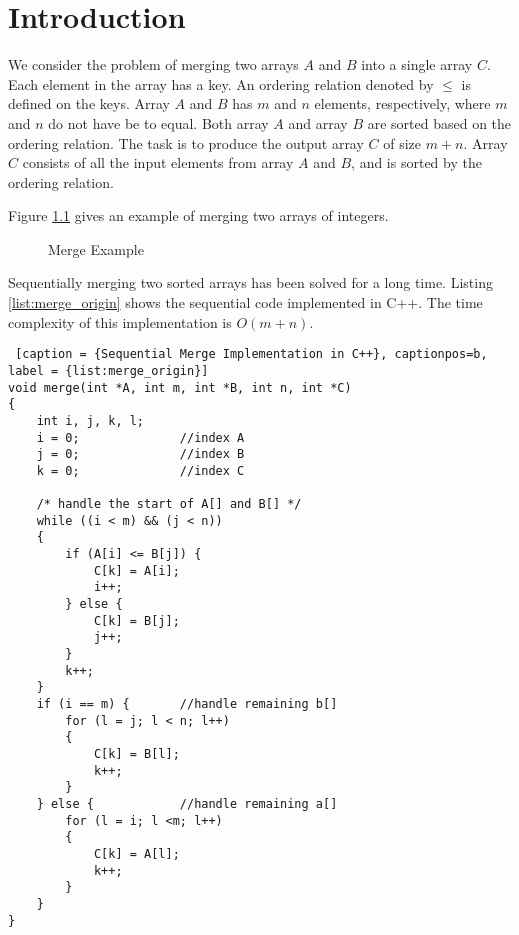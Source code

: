 \chapter{Introduction}


We consider the problem of merging two arrays $A$ and $B$ into a single array $C$. 
Each element in the array has a key. An ordering relation denoted by $\leq$ 
is defined on the keys. Array $A$ and $B$ has $m$ and $n$ elements, respectively, where 
$m$ and $n$ do not have be to equal.  
Both array $A$ and array $B$ are sorted based on the ordering relation. 
The task is to produce the output array $C$ of size $m+n$.  
Array $C$ consists of all the input elements from array $A$ and $B$, and is 
sorted by the ordering relation. 

Figure \ref{fig:merge} gives an example of merging two arrays of integers.  
\begin{figure}[!th]
\begin{center}
\end{center}
\caption{{\label{fig:merge}} Merge Example}
\end{figure}

Sequentially merging two sorted arrays has been solved for a long time. Listing 
\ref{list:merge_origin} shows the sequential code implemented in C++.  
The time complexity of this implementation is $O(m+n)$. 

        \begin{minipage}{\linewidth}
        \begin{singlespace}
        \begin{lstlisting} [caption = {Sequential Merge Implementation in C++}, captionpos=b, label = {list:merge_origin}]
void merge(int *A, int m, int *B, int n, int *C) 
{
    int i, j, k, l;
    i = 0;              //index A
    j = 0;              //index B
    k = 0;              //index C
  
    /* handle the start of A[] and B[] */
    while ((i < m) && (j < n))
    {
        if (A[i] <= B[j]) {
            C[k] = A[i];
            i++;
        } else {
            C[k] = B[j];
            j++;
        }
        k++;
    }
    if (i == m) {       //handle remaining b[]
        for (l = j; l < n; l++) 
        {
            C[k] = B[l];
            k++;
        }
    } else {            //handle remaining a[]
        for (l = i; l <m; l++) 
        {
            C[k] = A[l];
            k++;
        }
    }
}
        \end{lstlisting}
        \end{singlespace}
        \end{minipage}


